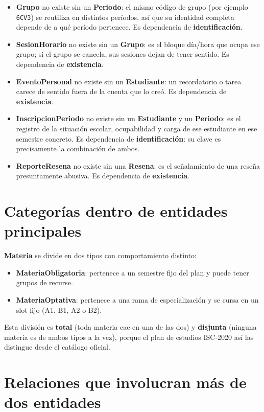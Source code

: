 \documentclass[11pt,letterpaper]{article}
\begin{document}
\begin{itemize}
  \item \textbf{Grupo} no existe sin un \textbf{Periodo}: el mismo código de grupo (por ejemplo \texttt{6CV3}) se reutiliza en distintos períodos, así que su identidad completa depende de a qué período pertenece. Es dependencia de \textbf{identificación}.
  \item \textbf{SesionHorario} no existe sin un \textbf{Grupo}: es el bloque día/hora que ocupa ese grupo; si el grupo se cancela, sus sesiones dejan de tener sentido. Es dependencia de \textbf{existencia}.
  \item \textbf{EventoPersonal} no existe sin un \textbf{Estudiante}: un recordatorio o tarea carece de sentido fuera de la cuenta que lo creó. Es dependencia de \textbf{existencia}.
  \item \textbf{InscripcionPeriodo} no existe sin un \textbf{Estudiante} y un \textbf{Periodo}: es el registro de la situación escolar, ocupabilidad y carga de ese estudiante en ese semestre concreto. Es dependencia de \textbf{identificación}: su clave es precisamente la combinación de ambos.
  \item \textbf{ReporteResena} no existe sin una \textbf{Resena}: es el señalamiento de una reseña presuntamente abusiva. Es dependencia de \textbf{existencia}.
\end{itemize}

\section{Categorías dentro de entidades principales}

\textbf{Materia} se divide en dos tipos con comportamiento distinto:

\begin{itemize}[nosep]
  \item \textbf{MateriaObligatoria}: pertenece a un semestre fijo del plan y puede tener grupos de recurse.
  \item \textbf{MateriaOptativa}: pertenece a una rama de especialización y se cursa en un slot fijo (A1, B1, A2 o B2).
\end{itemize}

Esta división es \textbf{total} (toda materia cae en una de las dos) y \textbf{disjunta} (ninguna materia es de ambos tipos a la vez), porque el plan de estudios ISC-2020 así las distingue desde el catálogo oficial.

\section{Relaciones que involucran más de dos entidades}
\end{document}
